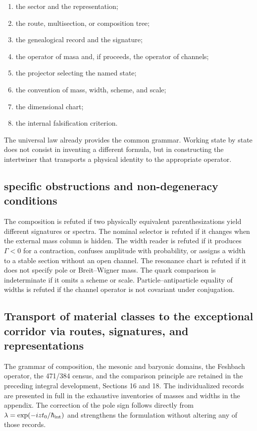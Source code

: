 \begin{enumerate}
\item the sector and the representation;
\item the route, multisection, or composition tree;
\item the genealogical record and the signature;
\item the operator of masa and, if proceeds, the operator of channels;
\item the projector selecting the named state;
\item the convention of mass, width, scheme, and scale;
\item the dimensional chart;
\item the internal falsification criterion.
\end{enumerate}
The universal law already provides the common grammar. Working state by state does not consist in inventing a different formula, but in constructing the intertwiner that transports a physical identity to the appropriate operator.

\subsection{specific obstructions and non-degeneracy conditions}
The composition is refuted if two physically equivalent parenthesizations yield different signatures or spectra. The nominal selector is refuted if it changes when the external mass column is hidden. The width reader is refuted if it produces \(\Gamma<0\) for a contraction, confuses amplitude with probability, or assigns a width to a stable section without an open channel. The resonance chart is refuted if it does not specify pole or Breit--Wigner mass. The quark comparison is indeterminate if it omits a scheme or scale. Particle--antiparticle equality of widths is refuted if the channel operator is not covariant under conjugation.

\subsection{Transport of material classes to the exceptional corridor via routes, signatures, and representations}
The grammar of composition, the mesonic and baryonic domains, the Feshbach operator, the 471/384 census, and the comparison principle are retained in the preceding integral development, Sections 16 and 18. The individualized records are presented in full in the exhaustive inventories of masses and widths in the appendix. The correction of the pole sign follows directly from \(\lambda=\exp(-izt_0/\hbar_{\rm int})\) and strengthens the formulation without altering any of those records.

